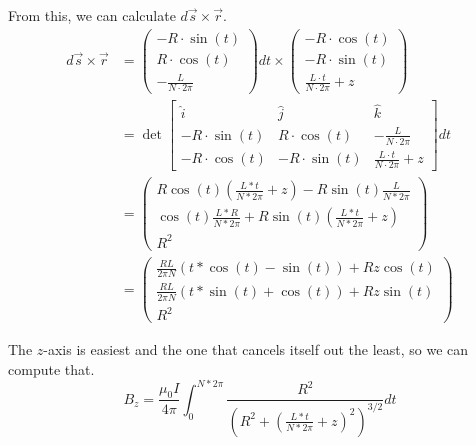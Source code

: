 \documentclass[12pt]{article}
\begin{document}
    From this, we can calculate $d\vec{s} \times \vec{r}$.
    \begin{align}
        d\vec{s} \times \vec{r} &=  \begin{pmatrix}
                -R \cdot \sin(t)\\
                R \cdot \cos(t)\\
                -\frac{L}{N \cdot 2\pi}
            \end{pmatrix} dt \times \begin{pmatrix}
                -R \cdot \cos(t)\\
                -R \cdot \sin(t)\\
                \frac{L \cdot t}{N \cdot 2\pi} + z
            \end{pmatrix}\\
            &=  \det \begin{bmatrix}
                \hat{i} &   \hat{j} &   \hat{k}\\
                -R \cdot \sin(t)    &   R \cdot \cos(t) &   -\frac{L}{N \cdot 2\pi}\\
                -R \cdot \cos(t)    &   -R \cdot \sin(t)&   \frac{L \cdot t}{N \cdot 2\pi} + z
            \end{bmatrix} dt\\
            &=  \begin{pmatrix}
                    R\cos(t)\left(\frac{L*t}{N*2\pi} + z\right) - R\sin(t)\frac{L}{N*2\pi}\\
                    \cos(t)\frac{L*R}{N*2\pi} + R\sin(t)\left(\frac{L*t}{N*2\pi} + z\right)\\
                    R^2
                \end{pmatrix}\\
            &=  \begin{pmatrix}
                    \frac{RL}{2\pi N} \left(t * \cos(t) - \sin(t)\right) + Rz\cos(t)\\
                    \frac{RL}{2\pi N} \left(t * \sin(t) + \cos(t)\right) + Rz\sin(t)\\
                    R^2
                \end{pmatrix}
    \end{align}
    
    The $z$-axis is easiest and the one that cancels itself out the least, so we can compute that.
    \begin{equation}
        B_z =   \frac{\mu_0 I}{4\pi}\int_{0}^{N*2\pi} \frac{R^2}{\left(R^2 + \left(\frac{L*t}{N*2\pi} + z\right)^2\right)^{3/2}}dt
    \end{equation}
\end{document}
